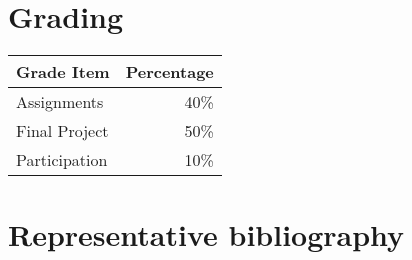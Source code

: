 \section{Grading}

\begin{tabular}{lr}
Grade Item	  & Percentage\\
\hline
Assignments	  & 40\% \\
Final Project	& 50\% \\
Participation	& 10\% \\
\hline
\end{tabular}




\section{Representative bibliography}

